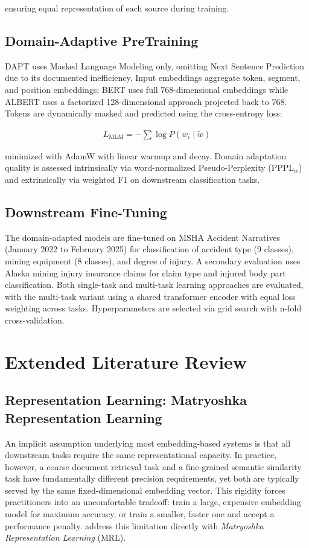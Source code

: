 \documentclass[a4paper,12pt]{article}
\begin{document}
ensuring equal representation of each source during training.

\subsection{Domain-Adaptive PreTraining}
DAPT uses Masked Language Modeling only, omitting Next Sentence Prediction due to its documented inefficiency. Input embeddings aggregate token, segment, and position embeddings; BERT uses full 768-dimensional embeddings while ALBERT uses a factorized 128-dimensional approach projected back to 768. Tokens are dynamically masked and predicted using the cross-entropy loss:

\begin{align}
L_{\text{MLM}} = - \sum \log P(w_i \mid \tilde{w})
\end{align}

minimized with AdamW with linear warmup and decay. Domain adaptation quality is assessed intrinsically via word-normalized Pseudo-Perplexity (PPPL$_w$) and extrinsically via weighted F1 on downstream classification tasks.

\subsection{Downstream Fine-Tuning}
The domain-adapted models are fine-tuned on MSHA Accident Narratives (January 2022 to February 2025) for classification of accident type (9 classes), mining equipment (8 classes), and degree of injury. A secondary evaluation uses Alaska mining injury insurance claims for claim type and injured body part classification. Both single-task and multi-task learning approaches are evaluated, with the multi-task variant using a shared transformer encoder with equal loss weighting across tasks. Hyperparameters are selected via grid search with n-fold cross-validation.

\clearpage
\section{Extended Literature Review}

\subsection{Representation Learning: Matryoshka Representation Learning}

An implicit assumption underlying most embedding-based systems is that all downstream
tasks require the same representational capacity. In practice, however, a coarse
document retrieval task and a fine-grained semantic similarity task have fundamentally
different precision requirements, yet both are typically served by the same
fixed-dimensional embedding vector. This rigidity forces practitioners into an
uncomfortable tradeoff: train a large, expensive embedding model for maximum accuracy,
or train a smaller, faster one and accept a performance penalty. \citet{kusupati2022matryoshka}
address this limitation directly with \textit{Matryoshka Representation Learning} (MRL).
\end{document}
